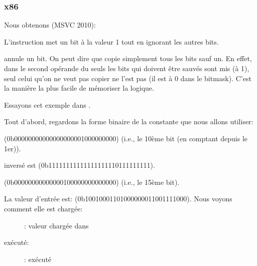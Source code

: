 \subsubsection{x86}


Nous obtenons (MSVC 2010):




L'instruction \OR met un bit à la valeur 1 tout en ignorant les autres bits.


\AND annule un bit. On peut dire que \AND copie simplement tous les bits sauf un.
En effet, dans le second opérande du \AND seuls les bits qui doivent être sauvés
sont mis (à 1), seul celui qu'on ne veut pas copier ne l'est pas (il est à 0 dans
le bitmask).
C'est la manière la plus facile de mémoriser la logique.

\clearpage
\mysubparagraph{\olly}

Essayons cet exemple dans \olly.

Tout d'abord, regardons la forme binaire de la constante que nous allons utiliser:

 (0b0000000000000000000{\color{red}1}000000000) (i.e., le 10ème bit (en
comptant depuis le 1er)).

 inversé est  (0b1111111111111111111{\color{red}0}111111111).

 (0b00000000000000{\color{red}1}00000000000000) (i.e., le 15ème bit).

La valeur d'entrée est:  (0b10010001101000000011001111000).
Nous voyons comment elle est chargée:

\begin{figure}[H]
\centering
{}
\caption{\olly: valeur chargée dans \ECX}
\label{fig:set_reset_olly1}
\end{figure}

\clearpage
\OR exécuté:

\begin{figure}[H]
\centering
{}
\caption{\olly: \OR exécuté}
\label{fig:set_reset_olly2}
\end{figure}

